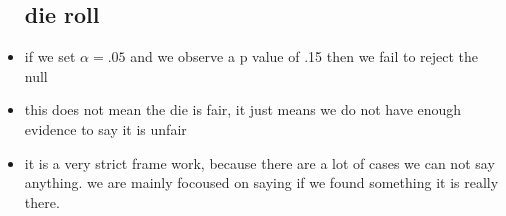 \documentclass{article}
\begin{document}
\begin{itemize}
\subsection{die roll}
\item if we set $\alpha=.05$ and we observe a p value of .15 then we fail to reject the null
\item this does not mean the die is fair, it just means we do not have enough evidence to say it is unfair
\item it is a very strict frame work, because there are a lot of cases we can not say anything. we are mainly focoused on saying if we found something it is really there. 

\end{itemize}
\end{document}
